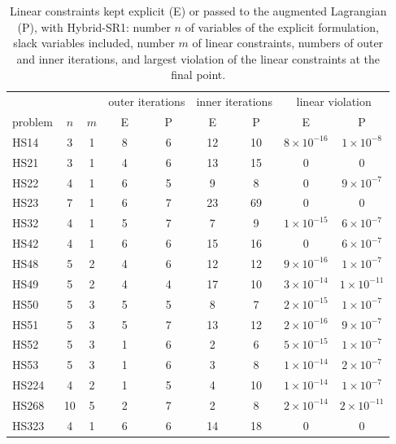 \documentclass{article}
\numberwithin{equation}{section}
\theoremstyle{plain}
\begin{document}
\begin{table}[htbp]
	\centering
	\caption{Linear constraints kept explicit (E) or passed to the augmented Lagrangian (P), with Hybrid-SR1: number $n$ of variables of the explicit formulation, slack variables included, number $m$ of linear constraints, numbers of outer and inner iterations, and largest violation of the linear constraints at the final point.}\label{tab:linear_constraints}
	\begin{tabular}{lcccccccc}
		\hline
		& & & \multicolumn{2}{c}{outer iterations} & \multicolumn{2}{c}{inner iterations} & \multicolumn{2}{c}{linear violation} \\
		problem & $n$ & $m$ & E & P & E & P & E & P \\
		\hline
		HS14 & 3 & 1 & 8 & 6 & 12 & 10 & $8\times10^{-16}$ & $1\times10^{-8}$ \\
		HS21 & 3 & 1 & 4 & 6 & 13 & 15 & 0 & 0 \\
		HS22 & 4 & 1 & 6 & 5 & 9 & 8 & 0 & $9\times10^{-7}$ \\
		HS23 & 7 & 1 & 6 & 7 & 23 & 69 & 0 & 0 \\
		HS32 & 4 & 1 & 5 & 7 & 7 & 9 & $1\times10^{-15}$ & $6\times10^{-7}$ \\
		HS42 & 4 & 1 & 6 & 6 & 15 & 16 & 0 & $6\times10^{-7}$ \\
		HS48 & 5 & 2 & 4 & 6 & 12 & 12 & $9\times10^{-16}$ & $1\times10^{-7}$ \\
		HS49 & 5 & 2 & 4 & 4 & 17 & 10 & $3\times10^{-14}$ & $1\times10^{-11}$ \\
		HS50 & 5 & 3 & 5 & 5 & 8 & 7 & $2\times10^{-15}$ & $1\times10^{-7}$ \\
		HS51 & 5 & 3 & 5 & 7 & 13 & 12 & $2\times10^{-16}$ & $9\times10^{-7}$ \\
		HS52 & 5 & 3 & 1 & 6 & 2 & 6 & $5\times10^{-15}$ & $1\times10^{-7}$ \\
		HS53 & 5 & 3 & 1 & 6 & 3 & 8 & $1\times10^{-14}$ & $2\times10^{-7}$ \\
		HS224 & 4 & 2 & 1 & 5 & 4 & 10 & $1\times10^{-14}$ & $1\times10^{-7}$ \\
		HS268 & 10 & 5 & 2 & 7 & 2 & 8 & $2\times10^{-14}$ & $2\times10^{-11}$ \\
		HS323 & 4 & 1 & 6 & 6 & 14 & 18 & 0 & 0 \\
		\hline
	\end{tabular}

\end{table}
\end{document}
